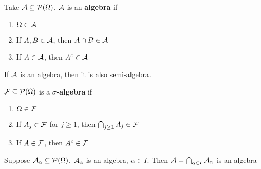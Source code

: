 \documentclass[11pt]{article}
\begin{document}
\begin{definition}[]
Take \(\mathcal{A}\subseteq\mathcal{P}(\Omega)\), \(\mathcal{A}\) is an \textbf{algebra} if
\begin{enumerate}
\item \(\Omega\in\mathcal{A}\)
\item If \(A,B\in\mathcal{A}\), then \(A\cap B\in\mathcal{A}\)
\item If \(A\in\mathcal{A}\), then \(A^c\in\mathcal{A}\)
\end{enumerate}
\end{definition}

If \(\mathcal{A}\) is an algebra, then it is also semi-algebra.

\begin{definition}[]
\(\mathcal{F}\subseteq\mathcal{P}(\Omega)\) is a \textbf{\(\sigma\)-algebra} if
\begin{enumerate}
\item \(\Omega\in\mathcal{F}\)
\item If \(A_j\in\mathcal{F}\) for \(j\ge 1\), then \(\bigcap_{j\ge1}A_j\in\mathcal{F}\)
\item If \(A\in\mathcal{F}\), then \(A^c\in\mathcal{F}\)
\end{enumerate}
\end{definition}

\begin{proposition}[]
Suppose \(\mathcal{A}_\alpha\subseteq\mathcal{P}(\Omega)\), \(\mathcal{A}_\alpha\) is an algebra, 
\(\alpha\in I\). Then \(\mathcal{A}=\bigcap_{\alpha\in I}\mathcal{A}_\alpha\) is an algebra
\end{proposition}
\end{document}
